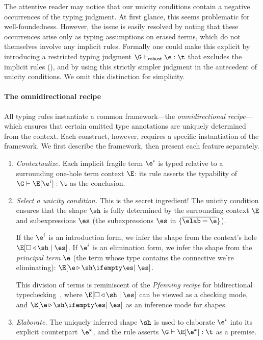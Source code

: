 \documentclass[acmsmall,screen,nonacm%
\Anonymous{,anonymous}{}%
\Final{}{,review}%
]{acmart}
\begin{document}

The attentive reader may notice that our unicity conditions contain a
negative occurrences of the typing judgment. At first glance, this seems
problematic for well-foundedness. However, the issue is easily resolved by
noting that these occurrences arise only as typing assumptions on erased
terms, which do not themselves involve any implicit rules. Formally one
could make this explicit by introducing a restricted typing judgment $\G
\throbust \e : \t$ that excludes the implicit rules (), and by
using this strictly simpler judgment in the antecedent of unicity
conditions. We omit this distinction for simplicity.

\paragraph{The omnidirectional recipe}
%
All typing rules instantiate a common framework---the \emph{omnidirectional
recipe}---which ensures that certain omitted type annotations are uniquely
determined from the context. Each construct, however, requires a specific
instantiation of the framework.
%
We first describe the framework, then present each feature separately.

\begin{enumerate}
  \item[\emph{Step 1}:] \emph{Contextualize.}
    Each implicit fragile term $\e^i$ is typed relative to a surrounding one-hole term context $\E$:
    its rule asserts the typability of $\G \th \E \where{\e^i} : \t$ as the conclusion.

  \item[\emph{Step 2}:] \emph{Select a unicity condition.}
    This is the secret ingredient! The unicity condition ensures that the shape
    $\sh$ is fully determined by the surrounding context $\E$ and
    subexpressions $\es$ (\eg the subexpressions $\es$ in $\erecord
    {\overline{\elab = \e}}$).

    If the $\e^i$ is an introduction form, we infer the shape from the context's
    hole $\Eshape \E \es \sh$. If $\e^i$ is an elimination form, we infer
    the shape from the \emph{principal term} $\e$ (the term whose type
    contains the connective we're eliminating): $\eshape[\es] \E \e \sh$.

    This division of terms is reminiscent of the \emph{Pfenning recipe} for
    bidirectional typechecking~\citep*{conf/popl/DunfieldP04}, where $\Eshape
    \E \es \sh$ can be viewed as a checking mode, and $\eshape[\es] \E \e \sh$
    as an inference mode for shapes.

  \item[\emph{Step 3}:] \emph{Elaborate.}
    The uniquely inferred shape $\sh$ is used to elaborate $\e^i$ into its
    explicit counterpart~$\e^x$, and the rule asserts $\G \th \E\where{\e^x}
    : \t$ as a premise.
\end{enumerate}
\end{document}

